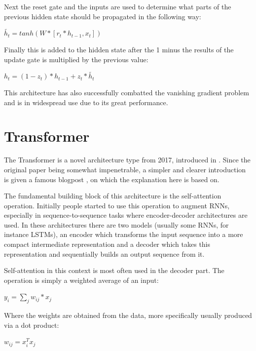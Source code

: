 \documentclass[bsc,frontabs,singlespacing,parskip,deptreport]{infthesis}
\begin{document}
Next the reset gate and the inputs are used to determine what parts of the previous hidden state should be propagated in the following way:

\begin{center}
$ \tilde{h_t} = tanh(W*[r_t*h_{t-1}, x_t]) $
\end{center}

Finally this is added to the hidden state after the 1 minus the results of the update gate is multiplied by the previous value:

\begin{center}
$ h_t = (1-z_t)*h_{t-1} + z_t*\tilde{h_t} $
\end{center}

This architecture has also successfully combatted the vanishing gradient problem and is in widespread use due to its great performance.

\section{Transformer}

The Transformer is a novel architecture type from 2017, introduced in \cite{transformer}. Since the original paper being somewhat impenetrable, a simpler and clearer introduction is given a famous blogpost \cite{transformer-blog}, on which the explanation here is based on.

The fundamental building block of this architecture is the self-attention operation. Initially people started to use this operation to augment RNNs, especially in sequence-to-sequence tasks where encoder-decoder architectures are used. In these architectures there are two models (usually some RNNs, for instance LSTMs), an encoder which transforms the input sequence into a more compact intermediate representation and a decoder which takes this representation and sequentially builds an output sequence from it.

Self-attention in this context is most often used in the decoder part. The operation is simply a weighted average of an input: 

\begin{center}
$ y_i = \sum_j w_{ij} * x_j $
\end{center}

Where the weights are obtained from the data, more specifically usually produced via a dot product:

\begin{center}
$ w_{ij} = x_i^T x_j $ 
\end{center}
\end{document}
